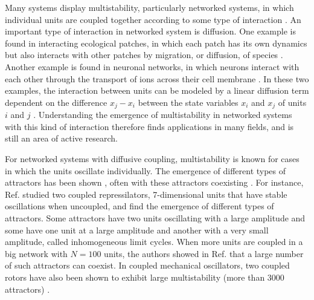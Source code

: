 Many systems display multistability, particularly networked systems, in which individual units are coupled together according to some type of interaction \cite{pisarchik2014control}. An important type of interaction in networked system is diffusion. One example is found in interacting ecological patches, in which each patch has its own dynamics but also interacts with other patches by migration, or diffusion, of species \cite{pilosof2017the}. Another example is found in neuronal networks, in which neurons interact with each other through the transport of ions across their cell membrane \cite{sohl2005expression, benett2004electrical}. In these two examples, the interaction between units can be modeled by a linear diffusion term dependent on the difference $x_j - x_i$ between the state variables $x_i$ and $x_j$ of units $i$ and $j$ \cite{stankovski2017coupling, loppini2015mathematical,kepler1990the, blasius1999complex, medeiros2021asymmetry, liang2023a, sadykov2021model}. Understanding the emergence of multistability in networked systems with this kind of interaction therefore finds applications in many fields, and is still an area of active research. 

For networked systems with diffusive coupling, multistability is known for cases in which the units oscillate individually. The emergence of different types of attractors has been shown \cite{mehrabbeik2023synchronization}, often with these attractors coexisting \cite{ullner2007multistability, ullner2008multistability, rossi2022shifts, yanagita2005pair, koseska2013oscillation, crowley1989experimental, sporns1987chaotic, aronson1987an, mondal2021spatiotemporal, ansmann2016selfinduced}. For instance, Ref. \cite{ullner2008multistability} studied two coupled repressilators, 7-dimensional units that have stable oscillations when uncoupled, and find the emergence of different types of attractors. Some attractors have two units oscillating with a large amplitude and some have one unit at a large amplitude and another with a very small amplitude, called inhomogeneous limit cycles. When more units are coupled in a big network with $N=100$ units, the authors showed in Ref. \cite{ullner2007multistability} that a large number of such attractors can coexist. In coupled mechanical oscillators, two coupled rotors have also been shown to exhibit large multistability (more than 3000 attractors) \cite{feudel1998dynamical}.

